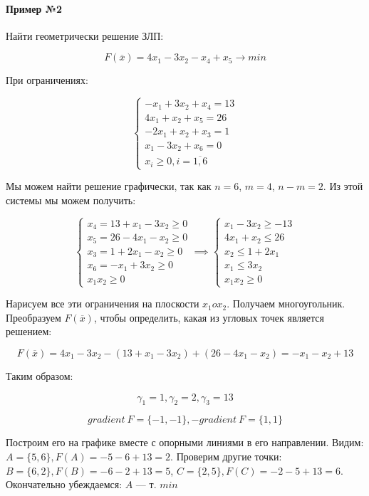 \documentclass{article}
\begin{document}
\paragraph{Пример №2}

Найти геометрически решение ЗЛП:

$$
F(\overline{x}) = 4x_1 - 3x_2 - x_4 + x_5 \to min
$$

При ограничениях:

$$
\begin{cases}
    -x_1 + 3x_2 + x_4 = 13 \\
    4x_1 + x_2 + x_5 = 26 \\
    -2x_1 + x_2 + x_3 = 1 \\
    x_1 - 3x_2 + x_6 = 0 \\
    x_{i} \ge 0, i = \overline{1, 6}    
\end{cases}
$$

Мы можем найти решение графически, так как $n = 6$, $m = 4$, $n - m = 2$. Из этой системы мы можем получить:

$$
\begin{cases}
  x_4 = 13 + x_{1} - 3x_{2} \ge 0 \\
  x_5 = 26 - 4x_1 - x_2 \ge 0 \\
  x_3 = 1 + 2x_1 - x_2 \ge 0 \\
  x_6 = -x_1 + 3x_2 \ge 0 \\
  x_1 x_2 \ge 0  
\end{cases} \implies
\begin{cases}
    x_1 - 3x_2 \ge -13 \\
    4x_1 + x_2 \le 26 \\
    x_2 \le 1 + 2x_1\\
    x_1 \le 3x_2 \\
    x_1 x_2 \ge 0
\end{cases}
$$

Нарисуем все эти ограничения на плоскости $x_1 o x_2$. Получаем многоугольник. Преобразуем $F(\overline{x})$, чтобы определить, какая из угловых точек является решением:

$$
F(\overline{x}) = 4x_1 - 3x_2 - (13 + x_1 - 3x_2) + (26 - 4x_1 - x_2) = -x_1 - x_2 + 13
$$

Таким образом:

$$
\gamma_1 = 1, \gamma_2 = 2, \gamma_3 = 13
$$

$$
gradient \ F = \{ -1, -1 \}, - gradient \ F = \{ 1, 1 \}
$$

Построим его на графике вместе с опорными линиями в его направлении. Видим: $A = \{ 5, 6 \}, F(A) = -5 - 6 + 13 = 2$. Проверим другие точки: $B = \{ 6, 2 \}, F(B) = -6 - 2 + 13 = 5$, $C = \{ 2, 5 \}, F(C) = -2 - 5 + 13 = 6$. Окончательно убеждаемся: $A$ — т. $min$
\end{document}
